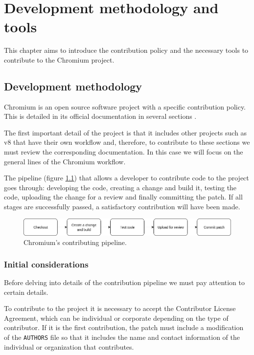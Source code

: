 \chapter{Development methodology and tools}
\label{chap:methodology}

This chapter aims to introduce the contribution policy and the necessary tools to contribute to the Chromium project.


\section{Development methodology}
Chromium is an open source software project with a specific contribution policy. This is detailed in its official documentation in several sections \cite{contributing,lifeofchromedev,contributingguide}.

The first important detail of the project is that it includes other projects such as v8 \cite{v8} that have their own workflow and, therefore, to contribute to these sections we must review the corresponding documentation. In this case we will focus on the general lines of the Chromium workflow.

The pipeline (figure \ref{fig:contributing_pipeline}) that allows a developer to contribute code to the project goes through: developing the code, creating a change and build it, testing the code, uploading the change for a review and finally committing the patch. If all stages are successfully passed, a satisfactory contribution will have been made.

\begin{figure}
    \centering
    \includegraphics[width=\textwidth]{img/contributing_pipeline.png}
    \caption{Chromium's contributing pipeline.}
    \label{fig:contributing_pipeline}
\end{figure}

\subsection{Initial considerations}

Before delving into details of the contribution pipeline we must pay attention to certain details.

To contribute to the project it is necessary to accept the Contributor License Agreement, which can be individual or corporate depending on the type of contributor. If it is the first contribution, the patch must include a modification of the \texttt{AUTHORS} file so that it includes the name and contact information of the individual or organization that contributes.

